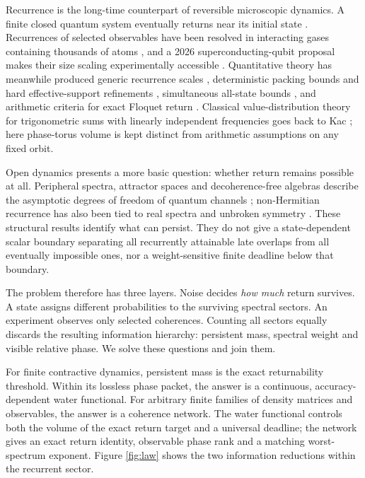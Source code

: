 \documentclass[10pt]{article}
\theoremstyle{definition}
\begin{document}
Recurrence is the long-time counterpart of reversible microscopic dynamics.
A finite closed quantum system eventually returns near its initial state
\cite{BocchieriLoinger1957}.  Recurrences of selected observables have been
resolved in interacting gases containing thousands of atoms
\cite{RauerEtAl2018}, and a 2026 superconducting-qubit proposal makes their
size scaling experimentally accessible \cite{KarimiEtAl2026}.  Quantitative
theory has meanwhile produced generic recurrence scales
\cite{CamposVenuti2015}, deterministic packing bounds and hard
effective-support refinements \cite{KotowskiOszmaniec2026}, simultaneous
all-state bounds \cite{GuptaShort2026}, and arithmetic criteria for exact
Floquet return \cite{AnandEtAl2026}.
Classical value-distribution theory for trigonometric sums with linearly
independent frequencies goes back to Kac \cite{Kac1943}; here phase-torus
volume is kept distinct from arithmetic assumptions on any fixed orbit.

Open dynamics presents a more basic question: whether return remains possible
at all.  Peripheral spectra, attractor spaces and decoherence-free algebras
describe the asymptotic degrees of freedom of quantum channels
\cite{WolfPerezGarcia2010,Albert2019,AmatoEtAl2023}; non-Hermitian recurrence
has also been tied to real spectra and unbroken symmetry
\cite{LiuZheng2024}.  These structural results identify what can persist.
They do not give a state-dependent scalar boundary separating all
recurrently attainable late overlaps from all eventually impossible ones,
nor a weight-sensitive finite deadline below that boundary.

The problem therefore has three layers.  Noise decides \emph{how much} return
survives.  A state assigns different probabilities to the surviving spectral
sectors.  An experiment observes only selected coherences.  Counting all
sectors equally discards the resulting information hierarchy: persistent
mass, spectral weight and visible relative phase.  We solve these questions
and join them.

For finite contractive dynamics, persistent mass is the exact returnability
threshold.  Within its lossless phase packet, the answer is a continuous,
accuracy-dependent water functional.  For arbitrary finite families of
density matrices and observables, the answer is a coherence network.  The
water functional controls both the volume of the exact return target and a
universal deadline; the network gives an exact return identity, observable
phase rank and a matching worst-spectrum exponent.  Figure \ref{fig:law}
shows the two information reductions within the recurrent sector.
\end{document}
